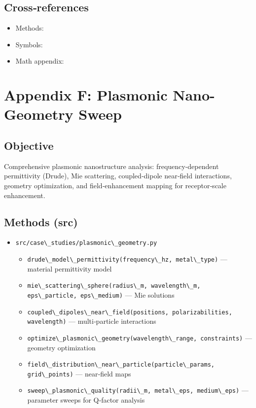 \documentclass[
  13pt,
  a4paperpaper,
  12pt]{article}
\newcommand{\passthrough}[1]{#1}
\providecommand{\tightlist}{%
  \setlength{\itemsep}{0pt}\setlength{\parskip}{0pt}}
\let\oldsection\section
\renewcommand{\section}{\clearpage\oldsection}
\begin{document}
\subsection{Cross‑references}\label{crossreferences-4}

\begin{itemize}
\tightlist
\item
  Methods: 
\item
  Symbols: 
\item
  Math appendix: 
\end{itemize}

\section{Appendix F: Plasmonic Nano-Geometry
Sweep}\label{sec:app_plasmonic_geometry}

\subsection{Objective}\label{objective-5}

Comprehensive plasmonic nanostructure analysis: frequency-dependent
permittivity (Drude), Mie scattering, coupled‑dipole near‑field
interactions, geometry optimization, and field‑enhancement mapping for
receptor‑scale enhancement.

\subsection{Methods (src)}\label{methods-src-5}

\begin{itemize}
\tightlist
\item
  \passthrough{\lstinline!src/case\_studies/plasmonic\_geometry.py!}

  \begin{itemize}
  \tightlist
  \item
    \passthrough{\lstinline!drude\_model\_permittivity(frequency\_hz, metal\_type)!}
    --- material permittivity model
  \item
    \passthrough{\lstinline!mie\_scattering\_sphere(radius\_m, wavelength\_m, eps\_particle, eps\_medium)!}
    --- Mie solutions
  \item
    \passthrough{\lstinline!coupled\_dipoles\_near\_field(positions, polarizabilities, wavelength)!}
    --- multi‑particle interactions
  \item
    \passthrough{\lstinline!optimize\_plasmonic\_geometry(wavelength\_range, constraints)!}
    --- geometry optimization
  \item
    \passthrough{\lstinline!field\_distribution\_near\_particle(particle\_params, grid\_points)!}
    --- near‑field maps
  \item
    \passthrough{\lstinline!sweep\_plasmonic\_quality(radii\_m, metal\_eps, medium\_eps)!}
    --- parameter sweeps for Q‑factor analysis
  \end{itemize}
\end{itemize}
\end{document}

